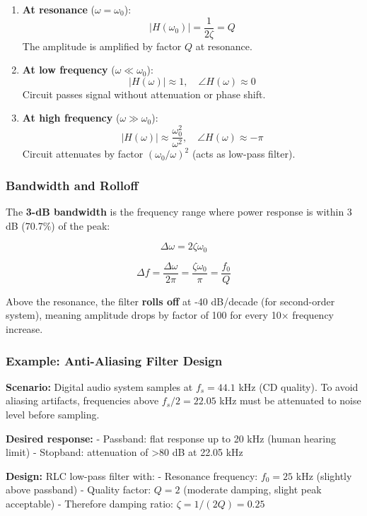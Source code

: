 \documentclass[
]{article}
\begin{document}
\begin{enumerate}
\def\labelenumi{\arabic{enumi}.}
\item
  \textbf{At resonance} (\(\omega = \omega_0\)):
  \[|H(\omega_0)| = \frac{1}{2\zeta} = Q\] The amplitude is amplified by
  factor \(Q\) at resonance.
\item
  \textbf{At low frequency} (\(\omega \ll \omega_0\)):
  \[|H(\omega)| \approx 1, \quad \angle H(\omega) \approx 0\] Circuit
  passes signal without attenuation or phase shift.
\item
  \textbf{At high frequency} (\(\omega \gg \omega_0\)):
  \[|H(\omega)| \approx \frac{\omega_0^2}{\omega^2}, \quad \angle H(\omega) \approx -\pi\]
  Circuit attenuates by factor \((\omega_0/\omega)^2\) (acts as low-pass
  filter).
\end{enumerate}

\subsubsection{Bandwidth and Rolloff}\label{bandwidth-and-rolloff}

The \textbf{3-dB bandwidth} is the frequency range where power response
is within 3 dB (70.7\%) of the peak:

\[\Delta \omega = 2\zeta\omega_0\]

\[\Delta f = \frac{\Delta \omega}{2\pi} = \frac{\zeta\omega_0}{\pi} = \frac{f_0}{Q}\]

Above the resonance, the filter \textbf{rolls off} at -40 dB/decade (for
second-order system), meaning amplitude drops by factor of 100 for every
10× frequency increase.

\subsubsection{Example: Anti-Aliasing Filter
Design}\label{example-anti-aliasing-filter-design}

\textbf{Scenario:} Digital audio system samples at \(f_s = 44.1\) kHz
(CD quality). To avoid aliasing artifacts, frequencies above
\(f_s/2 = 22.05\) kHz must be attenuated to noise level before sampling.

\textbf{Desired response:} - Passband: flat response up to 20 kHz (human
hearing limit) - Stopband: attenuation of \textgreater80 dB at 22.05 kHz

\textbf{Design:} RLC low-pass filter with: - Resonance frequency:
\(f_0 = 25\) kHz (slightly above passband) - Quality factor: \(Q = 2\)
(moderate damping, slight peak acceptable) - Therefore damping ratio:
\(\zeta = 1/(2Q) = 0.25\)
\end{document}
